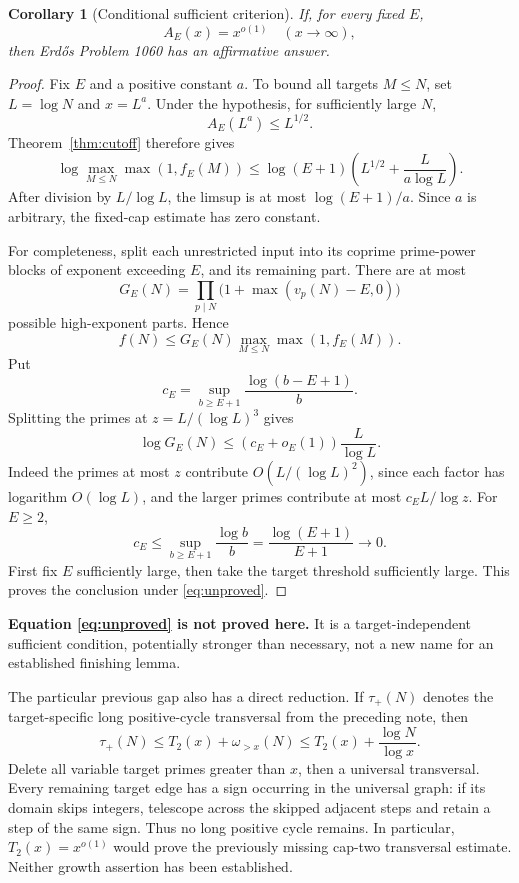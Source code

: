 \documentclass[11pt]{article}
\newtheorem{corollary}[theorem]{Corollary}
\begin{document}
\begin{corollary}[Conditional sufficient criterion]\label{cor:conditional}
If, for every fixed $E$,
\begin{equation}\label{eq:unproved}
 \boxed{A_E(x)=x^{o(1)}\quad(x\to\infty),}
\end{equation}
then Erd\H{o}s Problem 1060 has an affirmative answer.
\end{corollary}
\begin{proof}
Fix $E$ and a positive constant $a$. To bound all targets $M\le N$, set $L=\log N$ and $x=L^a$. Under the hypothesis, for sufficiently large $N$,
\[
 A_E(L^a)\le L^{1/2}.
\]
Theorem~\ref{thm:cutoff} therefore gives
\[
 \log\max_{M\le N}\max(1,f_E(M))
 \le\log(E+1)\left(L^{1/2}+\frac{L}{a\log L}\right).
\]
After division by $L/\log L$, the limsup is at most $\log(E+1)/a$. Since $a$ is arbitrary, the fixed-cap estimate has zero constant.

For completeness, split each unrestricted input into its coprime prime-power blocks of exponent exceeding $E$, and its remaining part. There are at most
\[
 G_E(N)=\prod_{p\mid N}\bigl(1+\max(v_p(N)-E,0)\bigr)
\]
possible high-exponent parts. Hence
\[
 f(N)\le G_E(N)\max_{M\le N}\max(1,f_E(M)).
\]
Put
\[
 c_E=\sup_{b\ge E+1}\frac{\log(b-E+1)}b.
\]
Splitting the primes at $z=L/(\log L)^3$ gives
\[
 \log G_E(N)\le(c_E+o_E(1))\frac{L}{\log L}.
\]
Indeed the primes at most $z$ contribute $O(L/(\log L)^2)$, since each factor has logarithm $O(\log L)$, and the larger primes contribute at most $c_EL/\log z$. For $E\ge2$,
\[
 c_E\le\sup_{b\ge E+1}\frac{\log b}{b}
 =\frac{\log(E+1)}{E+1}\longrightarrow0.
\]
First fix $E$ sufficiently large, then take the target threshold sufficiently large. This proves the conclusion under \eqref{eq:unproved}.
\end{proof}

\textbf{Equation \eqref{eq:unproved} is not proved here.} It is a target-independent sufficient condition, potentially stronger than necessary, not a new name for an established finishing lemma.

The particular previous gap also has a direct reduction. If $\tau_+(N)$ denotes the target-specific long positive-cycle transversal from the preceding note, then
\begin{equation}\label{eq:tau}
 \boxed{\tau_+(N)\le T_2(x)+\omega_{>x}(N)
 \le T_2(x)+\frac{\log N}{\log x}.}
\end{equation}
Delete all variable target primes greater than $x$, then a universal transversal. Every remaining target edge has a sign occurring in the universal graph: if its domain skips integers, telescope across the skipped adjacent steps and retain a step of the same sign. Thus no long positive cycle remains. In particular, $T_2(x)=x^{o(1)}$ would prove the previously missing cap-two transversal estimate. Neither growth assertion has been established.
\end{document}
